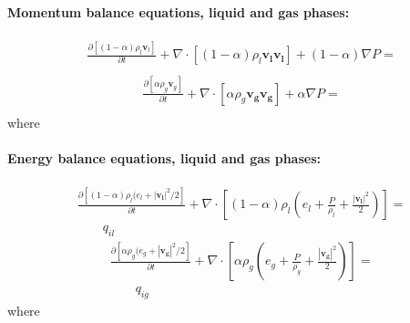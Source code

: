 \paragraph{Momentum balance equations, liquid and gas phases:}
\begin{equation}
	\begin{split}
		& \frac{\partial [(1-\alpha)\rho_l \mathbf{v}_l]}{\partial t} + \nabla \cdot [(1-\alpha) \rho_l \mathbf{v_l} \mathbf{v_l}] + (1 - \alpha) \nabla P = \\
		& \quad
	\end{split}
\label{eq:momentum_balance_liquid}
\end{equation}
\begin{equation}
	\begin{split}
		& \frac{\partial [\alpha \rho_g \mathbf{v}_g]}{\partial t} + \nabla \cdot [\alpha \rho_g \mathbf{v_g} \mathbf{v_g}] + \alpha \nabla P = \\
		& \quad
	\end{split}
\label{eq:momentum_balance_gas}
\end{equation}
where

\paragraph{Energy balance equations, liquid and gas phases:}
\begin{equation}
	\begin{split}
		& \frac{\partial [(1-\alpha)\rho_l(e_l + |\mathbf{v_l}|^2/2]}{\partial t} + \nabla \cdot \left[(1-\alpha) \rho_l \left(e_l+\frac{P}{\rho_l}+\frac{|\mathbf{v_l}|^2}{2}\right)\right] = \\
		&	\qquad q_{il}
	\end{split}
\label{eq:energy_balance_liquid}
\end{equation}
\begin{equation}
	\begin{split}
		 & \frac{\partial [\alpha \rho_g (e_g + |\mathbf{v_g}|^2/2]}{\partial t} + \nabla \cdot \left[\alpha \rho_g \left(e_g+\frac{P}{\rho_g}+\frac{|\mathbf{v_g}|^2}{2}\right)\right] = \\
		 & \qquad q_{ig}
	\end{split}
\label{eq:energy_balance_gas}
\end{equation}
where